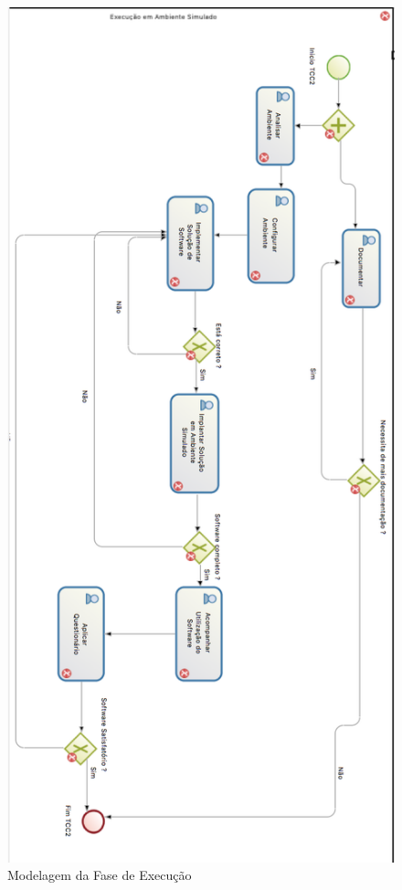 \graphicspath{{figuras/}}
\begin{figure}
\centering
\includegraphics[scale=0.60]{execucao}
\caption{Modelagem da Fase de Execução}
\label{img:execucao}
\end{figure}


